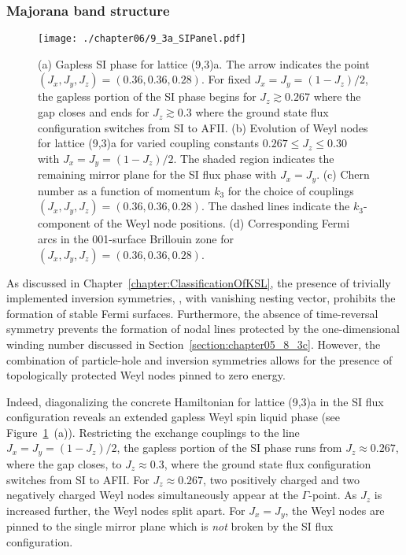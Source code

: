 %
%
\subsubsection{Majorana band structure}
%
%
%
\begin{figure}[tb]
	\centering
	\texttt{[image: ./chapter06/9\_3a\_SIPanel.pdf]}
	\caption{
		(a) Gapless SI phase for lattice (9,3)a.
		The arrow indicates the point $(J_x, J_y, J_z) = (0.36, 0.36, 0.28)$.
		For fixed $J_x = J_y = (1 - J_z)/2$, the gapless portion of the SI phase begins for $J_z \gtrsim 0.267$ where the gap closes and ends for $J_z \gtrsim 0.3$ where the ground state flux configuration switches from SI to AFII.
		(b) Evolution of Weyl nodes for lattice (9,3)a for varied coupling constants $0.267 \leq J_z \leq 0.30$ with $J_x = J_y = (1 - J_z)/2$.
		The shaded region indicates the remaining mirror plane for the SI flux phase with $J_x = J_y$.
		(c) Chern number as a function of momentum $k_3$ for the choice of couplings $(J_x, J_y, J_z) = (0.36, 0.36, 0.28)$.
		The dashed lines indicate the $k_3$-component of the Weyl node positions.
		(d) Corresponding Fermi arcs in the 001-surface Brillouin zone for $(J_x, J_y, J_z) = (0.36, 0.36, 0.28)$.
	}
	\label{fig:chapter06_SIPanel}
\end{figure}
%
As discussed in Chapter~\ref{chapter:ClassificationOfKSL}, the presence of trivially implemented inversion symmetries, \ie, with vanishing nesting vector, prohibits the formation of stable Fermi surfaces.
Furthermore, the absence of time-reversal symmetry prevents the formation of nodal lines protected by the one-dimensional winding number discussed in Section~\ref{section:chapter05_8_3c}.
However, the combination of particle-hole and inversion symmetries allows for the presence of topologically protected Weyl nodes pinned to zero energy.

Indeed, diagonalizing the concrete Hamiltonian for lattice (9,3)a in the SI flux configuration reveals an extended gapless Weyl spin liquid phase (see Figure~\ref{fig:chapter06_SIPanel}~(a)).
Restricting the exchange couplings to the line $J_x = J_y = (1 - J_z)/2$, the gapless portion of the SI phase runs from $J_z \approx 0.267$, where the gap closes, to $J_z \approx 0.3$, where the ground state flux configuration switches from SI to AFII.
For $J_z \approx 0.267$, two positively charged and two negatively charged Weyl nodes simultaneously appear at the $\Gamma$-point.
As $J_z$ is increased further, the Weyl nodes split apart.
For $J_x = J_y$, the Weyl nodes are pinned to the single mirror plane which is \textit{not} broken by the SI flux configuration.

